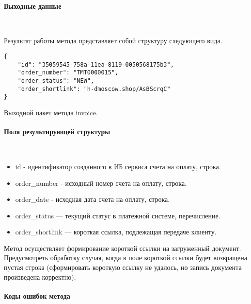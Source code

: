 \documentclass[11pt, a4paper]{article}
\begin{document}
\paragraph{Выходные данные}\

Результат работы метода представляет собой структуру следующего вида.

\begin{listing}[H]
\begin{verbatim}
{
	"id": "35059545-758a-11ea-8119-0050568175b3",
	"order_number": "ТМТ0000015",
	"order_status": "NEW",
	"order_shortlink": "h-dmoscow.shop/AsBScrqC"
}
\end{verbatim}
\caption{Выходной пакет метода invoice.} 
\end{listing}

\paragraph{Поля результирующей структуры}\

\begin{itemize}
	\item id - идентификатор созданного в ИБ сервиса счета на оплату, строка.
	\item order\_number - исходный номер счета на оплату, строка.
	\item order\_date - исходная дата счета на оплату, строка.
	\item order\_status — текущий статус в платежной системе, перечисление.
	\item order\_shortlink — короткая ссылка, подлежащая передаче клиенту.
\end{itemize}

Метод осуществляет формирование короткой ссылки на загруженный документ. Предусмотреть обработку случая, когда в поле короткой ссылки будет возвращена пустая строка (сформировать короткую ссылку не удалось, но запись документа произведена корректно).

\paragraph{Коды ошибок метода}\
\end{document}
